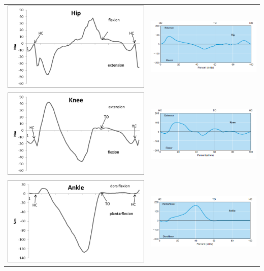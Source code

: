 \begin{center}
    \begin{tabular}{cc}
        \includegraphics[width=.48\textwidth, keepaspectratio]{fig/id-hip.png} & \includegraphics[width=.48\textwidth, keepaspectratio]{fig/id-hip-ref.png}\\[3pt]
        \includegraphics[width=.48\textwidth, keepaspectratio]{fig/id-knee.png} & \includegraphics[width=.48\textwidth, keepaspectratio]{fig/id-knee-ref.png}\\[3pt]
        \includegraphics[width=.48\textwidth, keepaspectratio]{fig/id-ankle.png} & \includegraphics[width=.48\textwidth, keepaspectratio]{fig/id-ankle-ref.png}
    \end{tabular}
    \label{tab:id-hip-knee-ankle-moments}
\end{center}

